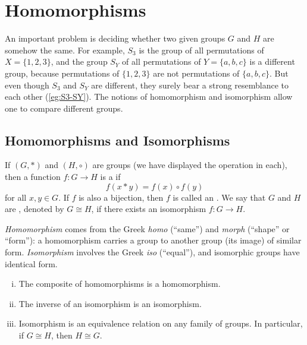 
\section{Homomorphisms}

An important problem is deciding whether two given groups \(G\) and \(H\) are somehow the
same. For example, \(S_3\) is the group of all permutations of \(X = \{1,2,3\}\), and the
group \(S_Y\) of all permutations of \(Y = \{a,b,c\}\) is a different group, because
permutations of \(\{1,2,3\}\) are not permutations of \(\{a,b,c\}\). But even though
\(S_3\) and \(S_Y\) are different, they surely bear a strong resemblance to each other
(\autoref{eg:S3-SY}). The notions of homomorphism and isomorphism allow one to compare
different groups.

\subsection{Homomorphisms and Isomorphisms}

\begin{definition}\label{def:homomorphism}
	If \((G, *)\) and \((H, \circ)\) are groups (we have displayed the operation in each),
	then a function \(f\colon G \to H\) is a  if
	\[
		f(x * y) = f(x) \circ f(y)
	\]
	for all \(x, y \in G\). If \(f\) is also a bijection, then \(f\) is called an
	. We say that \(G\) and \(H\) are , denoted by
	\(G \cong H\), if there exists an isomorphism \(f\colon G \to H\).
\end{definition}

\begin{note}[Etymology]
	\emph{Homomorphism} comes from the Greek \emph{homo} (``same'') and \emph{morph}
	(``shape'' or ``form''): a homomorphism carries a group to another group (its image) of
	similar form. \emph{Isomorphism} involves the Greek \emph{iso} (``equal''), and
	isomorphic groups have identical form.
\end{note}

\begin{lemma}\label{lem:iso-equivalence}
	\begin{enumerate}[(i)]
		\item The composite of homomorphisms is a homomorphism.
		\item The inverse of an isomorphism is an isomorphism.
		\item Isomorphism is an equivalence relation on any family of groups. In particular,
		      if \(G \cong H\), then \(H \cong G\).
	\end{enumerate}
\end{lemma}

